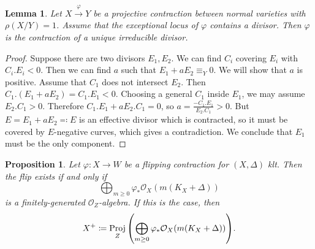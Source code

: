\documentclass[leqno, openany]{memoir}
\newtheorem{prop}[thm]{Proposition}
\newtheorem{lem}[thm]{Lemma}
\theoremstyle{definition}
\theoremstyle{remark}
\theoremstyle{plain}
\theoremstyle{definition}
\theoremstyle{remark}
\newcommand{\mc}[1]{\mathcal{#1}}
\DeclareMathOperator{\Proj}{Proj}
\begin{document}
\begin{lem}
    Let $X \xrightarrow{\varphi} Y$ be a projective contraction between normal varieties with $\rho(X/Y) = 1$. Assume that the exceptional locus of $\varphi$ contains a divisor. Then $\varphi$ is the contraction of a unique irreducible divisor.
\end{lem}

\begin{proof}
    Suppose there are two divisors $E_1, E_2$. We can find $C_i$ covering $E_i$ with $C_i.E_i < 0$. Then we can find $a$ such that $E_1 + a E_2 \equiv_Y 0$. We will show that $a$ is positive. Assume that $C_1$ does not intersect $E_2$. Then $C_1.(E_1 + aE_2) = C_1.E_1 < 0$. Choosing a general $C_1$ inside $E_1$, we may assume $E_2.C_1 > 0$. Therefore $C_1.E_1 + aE_2.C_1 = 0$, so $a = \frac{-C_1.E_1}{E_2.C_1} > 0$. But $E = E_1 + aE_2 \eqqcolon E$ is an effective divisor which is contracted, so it must be covered by $E$-negative curves, which gives a contradiction. We conclude that $E_1$ must be the only component.
\end{proof}

\begin{prop}
    Let $\varphi \colon X \to W$ be a flipping contraction for $(X, \Delta)$ klt. Then the flip exists if and only if
    \[ \bigoplus_{m \geq 0} \varphi_* \mc{O}_X(m(K_X + \Delta)) \]
    is a finitely-generated $\mc{O}_Z$-algebra. If this is the case, then
    \[ X^+ \coloneqq \Proj_Z \qty(\bigoplus_{m \geq 0} \varphi_* \mc{O}_X(m(K_X + \Delta))). \]
\end{prop}
\end{document}
